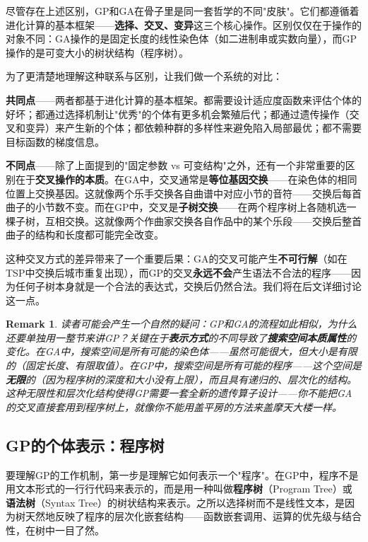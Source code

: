 \documentclass[lang=cn,zihao=-4,a4paper,fontset=windows]{beautybook}
\newtheorem*{remark}{\textbf{Remark}}
\begin{document}
尽管存在上述区别，GP和GA在骨子里是同一套哲学的不同"皮肤"。它们都遵循着进化计算的基本框架——\textbf{选择、交叉、变异}这三个核心操作。区别仅仅在于操作的对象不同：GA操作的是固定长度的线性染色体（如二进制串或实数向量），而GP操作的是可变大小的树状结构（程序树）。

为了更清楚地理解这种联系与区别，让我们做一个系统的对比：

\textbf{共同点}——两者都基于进化计算的基本框架。都需要设计适应度函数来评估个体的好坏；都通过选择机制让"优秀"的个体有更多机会繁殖后代；都通过遗传操作（交叉和变异）来产生新的个体；都依赖种群的多样性来避免陷入局部最优；都不需要目标函数的梯度信息。

\textbf{不同点}——除了上面提到的"固定参数 vs 可变结构"之外，还有一个非常重要的区别在于\textbf{交叉操作的本质}。在GA中，交叉通常是\textbf{等位基因交换}——在染色体的相同位置上交换基因。这就像两个乐手交换各自曲谱中对应小节的音符——交换后每首曲子的小节数不变。而在GP中，交叉是\textbf{子树交换}——在两个程序树上各随机选一棵子树，互相交换。这就像两个作曲家交换各自作品中的某个乐段——交换后整首曲子的结构和长度都可能完全改变。

这种交叉方式的差异带来了一个重要后果：GA的交叉可能产生\textbf{不可行解}（如在TSP中交换后城市重复出现），而GP的交叉\textbf{永远不会}产生语法不合法的程序——因为任何子树本身就是一个合法的表达式，交换后仍然合法。我们将在后文详细讨论这一点。

\begin{remark}
读者可能会产生一个自然的疑问：GP和GA的流程如此相似，为什么还要单独用一整节来讲GP？关键在于\textbf{表示方式}的不同导致了\textbf{搜索空间本质属性}的变化。在GA中，搜索空间是所有可能的染色体——虽然可能很大，但大小是有限的（固定长度、有限取值）。在GP中，搜索空间是所有可能的程序——这个空间是\textbf{无限}的（因为程序树的深度和大小没有上限），而且具有递归的、层次化的结构。这种无限性和层次化结构使得GP需要一套全新的遗传算子设计——你不能把GA的交叉直接套用到程序树上，就像你不能用盖平房的方法来盖摩天大楼一样。
\end{remark}

\subsection{GP的个体表示：程序树}

要理解GP的工作机制，第一步是理解它如何表示一个"程序"。在GP中，程序不是用文本形式的一行行代码来表示的，而是用一种叫做\textbf{程序树}（Program Tree）或\textbf{语法树}（Syntax Tree）的树状结构来表示。之所以选择树而不是线性文本，是因为树天然地反映了程序的层次化嵌套结构——函数嵌套调用、运算的优先级与结合性，在树中一目了然。
\end{document}
